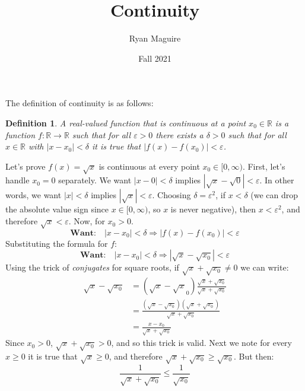 \documentclass{article}
\title{Continuity}
\author{Ryan Maguire}
\date{Fall 2021}
\theoremstyle{normal}
\newtheorem{definition}{Definition}
\theoremstyle{plain}
\begin{document}
    \maketitle
    The definition of continuity is as follows:
    \begin{definition}
        A real-valued function that is continuous at a point
        $x_{0}\in\mathbb{R}$ is a function $f:\mathbb{R}\rightarrow\mathbb{R}$
        such that for all $\varepsilon>0$ there exists a $\delta>0$ such that
        for all $x\in\mathbb{R}$ with $|x-x_{0}|<\delta$ it is true that
        $|f(x)-f(x_{0})|<\varepsilon$.
    \end{definition}
    Let's prove $f(x)=\sqrt{x}$ is continuous at every point
    $x_{0}\in[0,\infty)$. First, let's handle $x_{0}=0$ separately. We want
    $|x-0|<\delta$ implies $|\sqrt{x}-\sqrt{0}|<\varepsilon$. In other
    words, we want $|x|<\delta$ implies $|\sqrt{x}|<\varepsilon$. Choosing
    $\delta=\varepsilon^{2}$, if $x<\delta$ (we can drop the absolute value
    sign since $x\in[0,\infty)$, so $x$ is never negative), then
    $x<\varepsilon^{2}$, and therefore $\sqrt{x}<\varepsilon$. Now, for
    $x_{0}>0$.
    \begin{equation}
        \textbf{Want:}\quad
        |x-x_{0}|<\delta\Rightarrow
        |f(x)-f(x_{0})|<\varepsilon
    \end{equation}
    Substituting the formula for $f$:
    \begin{equation}
        \textbf{Want:}\quad
        |x-x_{0}|<\delta\Rightarrow
        |\sqrt{x}-\sqrt{x_{0}}|<\varepsilon
    \end{equation}
    Using the trick of \textit{conjugates} for square roots, if
    $\sqrt{x}+\sqrt{x_{0}}\ne{0}$ we can write:
    \begin{align}
        \sqrt{x}-\sqrt{x_{0}}
        &=(\sqrt{x}-\sqrt{x}_{0})
            \frac{\sqrt{x}+\sqrt{x_{0}}}{\sqrt{x}+\sqrt{x_{0}}}\\
        &=\frac{(\sqrt{x}-\sqrt{x_{0}})(\sqrt{x}+\sqrt{x_{0}})}
              {\sqrt{x}+\sqrt{x_{0}}}\\
        &=\frac{x-x_{0}}{\sqrt{x}+\sqrt{x_{0}}}
    \end{align}
    Since $x_{0}>0$, $\sqrt{x}+\sqrt{x_{0}}>0$, and so this
    trick is valid. Next we note for every $x\geq{0}$ it is true that
    $\sqrt{x}\geq{0}$, and therefore $\sqrt{x}+\sqrt{x_{0}}\geq\sqrt{x_{0}}$.
    But then:
    \begin{equation}
        \frac{1}{\sqrt{x}+\sqrt{x_{0}}}\leq\frac{1}{\sqrt{x_{0}}}
    \end{equation}
\end{document}
